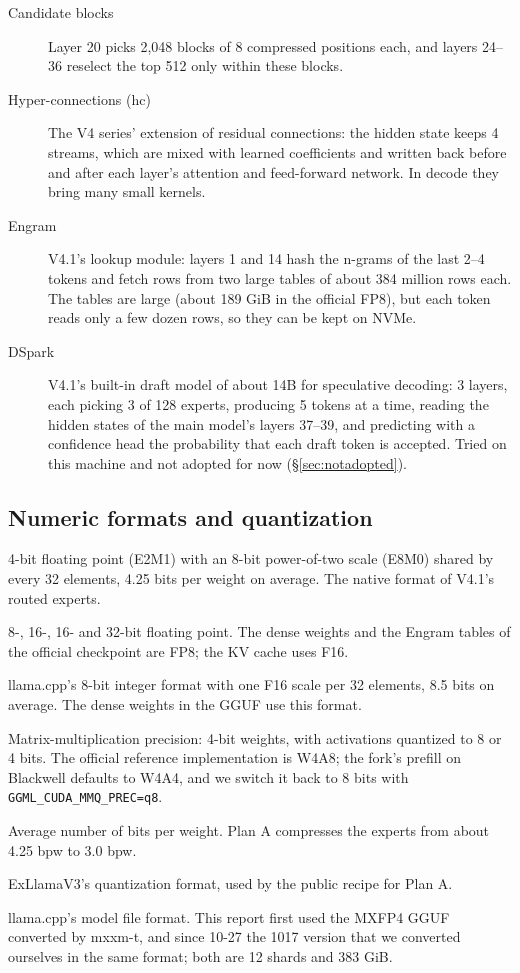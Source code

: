 \documentclass[11pt,a4paper]{article}
\newcommand{\code}[1]{\texttt{#1}}
\begin{document}
\begin{description}
  \item[Candidate blocks] Layer 20 picks 2,048 blocks of 8 compressed positions each, and layers 24--36 reselect the top 512 only within these blocks.
  \item[Hyper-connections (hc)] The V4 series' extension of residual connections: the hidden state keeps 4 streams, which are mixed with learned coefficients and written back before and after each layer's attention and feed-forward network. In decode they bring many small kernels.
  \item[Engram] V4.1's lookup module: layers 1 and 14 hash the n-grams of the last 2--4 tokens and fetch rows from two large tables of about 384 million rows each. The tables are large (about 189 GiB in the official FP8), but each token reads only a few dozen rows, so they can be kept on NVMe.
  \item[DSpark] V4.1's built-in draft model of about 14B for speculative decoding: 3 layers, each picking 3 of 128 experts, producing 5 tokens at a time, reading the hidden states of the main model's layers 37--39, and predicting with a confidence head the probability that each draft token is accepted. Tried on this machine and not adopted for now (\S\ref{sec:notadopted}).
\end{description}

\subsection*{Numeric formats and quantization}
\begin{description}\small
  \item[MXFP4] 4-bit floating point (E2M1) with an 8-bit power-of-two scale (E8M0) shared by every 32 elements, 4.25 bits per weight on average. The native format of V4.1's routed experts.
  \item[FP8, BF16, F16, F32] 8-, 16-, 16- and 32-bit floating point. The dense weights and the Engram tables of the official checkpoint are FP8; the KV cache uses F16.
  \item[Q8\_0] llama.cpp's 8-bit integer format with one F16 scale per 32 elements, 8.5 bits on average. The dense weights in the GGUF use this format.
  \item[W4A8, W4A4] Matrix-multiplication precision: 4-bit weights, with activations quantized to 8 or 4 bits. The official reference implementation is W4A8; the fork's prefill on Blackwell defaults to W4A4, and we switch it back to 8 bits with \code{GGML\_CUDA\_MMQ\_PREC=q8}.
  \item[bpw] Average number of bits per weight. Plan A compresses the experts from about 4.25 bpw to 3.0 bpw.
  \item[EXL3] ExLlamaV3's quantization format, used by the public recipe for Plan A.
  \item[GGUF] llama.cpp's model file format. This report first used the MXFP4 GGUF converted by mxxm-t, and since 10-27 the 1017 version that we converted ourselves in the same format; both are 12 shards and 383 GiB.
\end{description}
\end{document}

